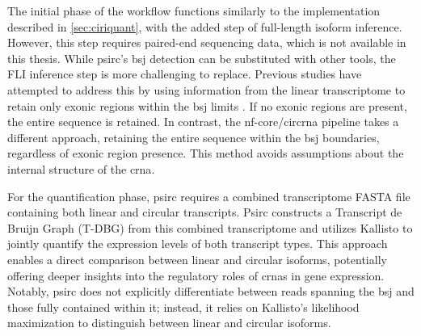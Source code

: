 The initial phase of the workflow functions similarly to the implementation
described in \cref{sec:ciriquant}, with the added step of full-length isoform
inference.
However, this step requires paired-end sequencing data, which is not available
in this thesis.
While psirc's \gls{bsj} detection can be substituted with other tools, the FLI
inference step is more challenging to replace.
Previous studies have attempted to address this by using information from the
linear transcriptome to retain only exonic regions within the \gls{bsj} limits
\supercite{hoffmann_circrna-sponging_2023}.
If no exonic regions are present, the entire sequence is retained.
In contrast, the nf-core/circrna pipeline takes a different approach, retaining
the entire sequence within the \gls{bsj} boundaries, regardless of exonic
region presence.
This method avoids assumptions about the internal structure of the \gls{crna}.

For the quantification phase, psirc requires a combined transcriptome FASTA
file containing both linear and circular transcripts.
Psirc constructs a Transcript de Bruijn Graph (T-DBG) from this combined
transcriptome and utilizes Kallisto to jointly quantify the expression levels
of both transcript types\supercite{yu_quantifying_2021}.
This approach enables a direct comparison between linear and circular isoforms,
potentially offering deeper insights into the regulatory roles of \gls{crna}s
in gene expression.
Notably, psirc does not explicitly differentiate between reads spanning the
\gls{bsj} and those fully contained within it; instead, it relies on Kallisto's
likelihood maximization to distinguish between linear and circular
isoforms\supercite{yu_quantifying_2021}.
